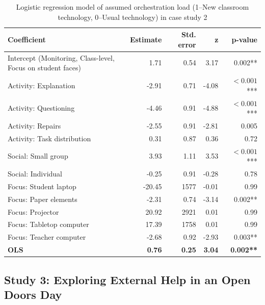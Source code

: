 \documentclass[10pt,journal,compsoc]{IEEEtran}
\begin{document}
\begin{table}[!t]
\caption{Logistic regression model of assumed orchestration load (1--New classroom technology, 0--Usual technology) in case study 2}
\label{tab:case2results}
\centering
\begin{tabular}{|p{2.8cm}||r|r|r|r|}
\hline
Coefficient & Estimate & Std. error & z & p-value\\
\hline
\hline
Intercept (Monitoring, Class-level, Focus on student faces) & 1.71 & 0.54 & 3.17 & 0.002** \\
Activity: Explanation & -2.91 & 0.71 & -4.08 & $<0.001$*** \\
Activity: Questioning & -4.46 & 0.91 & -4.88 & $<0.001$*** \\
Activity: Repairs & -2.55 & 0.91 & -2.81 & 0.005 \\
Activity: Task distribution & 0.31 & 0.87 & 0.36 & 0.72 \\
Social: Small group & 3.93 & 1.11 & 3.53 & $<0.001$*** \\
Social: Individual & -0.25 & 0.91 & -0.28 & 0.78 \\
Focus: Student laptop & -20.45 & 1577 & -0.01 & 0.99 \\
Focus: Paper elements & -2.31 & 0.74 & -3.14 & 0.002** \\
Focus: Projector & 20.92 & 2921 & 0.01 & 0.99 \\
Focus: Tabletop computer & 17.39 & 1758 & 0.01 & 0.99 \\
Focus: Teacher computer & -2.68 & 0.92 & -2.93 & 0.003** \\
\textbf{OLS} & \textbf{0.76} & \textbf{0.25} & \textbf{3.04} & \textbf{0.002**} \\
\hline
\end{tabular}
\end{table}


\subsection{Study 3: Exploring External Help in an Open Doors Day}
\label{sec:study3}
\end{document}
